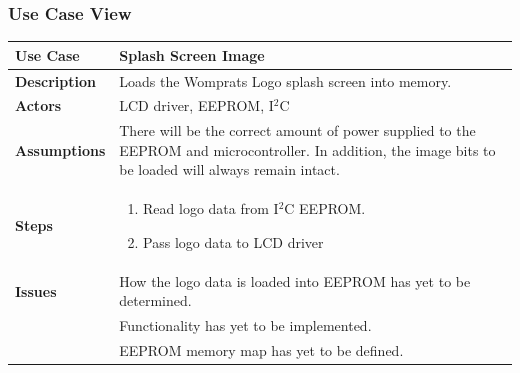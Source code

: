 \documentclass{article}
\begin{document}
\subsubsection{Use Case View}
\begin{tabular}{|p{1in}|p{5in}|}
\hline
\textbf{Use Case} & Splash Screen Image\\
\hline
\textbf{Description} & Loads the Womprats Logo splash screen into memory.\\
\hline
\textbf{Actors} & LCD driver, EEPROM, I$^2$C\\
\hline
\textbf{Assumptions} & There will be the correct amount of power supplied to the EEPROM and microcontroller.  In addition, the image bits to be loaded will always remain intact.\\
\hline
\textbf{Steps} & \begin{enumerate}
\item Read logo data from I$^2$C EEPROM.
\item Pass logo data to LCD driver
\end{enumerate}\\
\hline
\textbf{Issues} & How the logo data is loaded into EEPROM has yet to be determined.\\
& Functionality has yet to be implemented.\\
& EEPROM memory map has yet to be defined.\\
\hline
\end{tabular}
\end{document}
